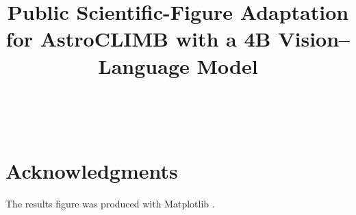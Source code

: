 \documentclass[11pt]{article}
\title{Public Scientific-Figure Adaptation for AstroCLIMB with a 4B Vision--Language Model}
\author{\PaperAuthorName \\
  \PaperAuthorAffiliation \\
  \texttt{\PaperAuthorEmail}}
\begin{document}
\maketitle

\section*{Acknowledgments}


The results figure was produced with Matplotlib \citep{matplotlib}.
\ifdefined\CameraReady

\PaperAcknowledgments
\fi
\clearpage

\end{document}
